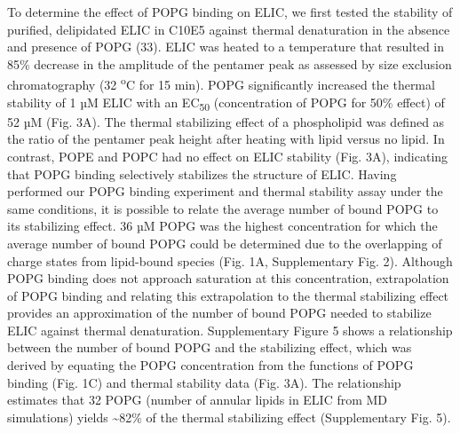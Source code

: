 To determine the effect of POPG binding on ELIC, we first tested the
stability of purified, delipidated ELIC in C10E5 against thermal
denaturation in the absence and presence of POPG (33). ELIC was heated
to a temperature that resulted in 85\% decrease in the amplitude of the
pentamer peak as assessed by size exclusion chromatography (32
\textsuperscript{o}C for 15 min). POPG significantly increased the
thermal stability of 1 µM ELIC with an EC\textsubscript{50}
(concentration of POPG for 50\% effect) of 52 µM (Fig. 3A). The thermal
stabilizing effect of a phospholipid was defined as the ratio of the
pentamer peak height after heating with lipid versus no lipid. In
contrast, POPE and POPC had no effect on ELIC stability (Fig. 3A),
indicating that POPG binding selectively stabilizes the structure of
ELIC. Having performed our POPG binding experiment and thermal stability
assay under the same conditions, it is possible to relate the average
number of bound POPG to its stabilizing effect. 36 µM POPG was the
highest concentration for which the average number of bound POPG could
be determined due to the overlapping of charge states from lipid-bound
species (Fig. 1A, Supplementary Fig. 2). Although POPG binding does not
approach saturation at this concentration, extrapolation of POPG binding
and relating this extrapolation to the thermal stabilizing effect
provides an approximation of the number of bound POPG needed to
stabilize ELIC against thermal denaturation. Supplementary Figure 5
shows a relationship between the number of bound POPG and the
stabilizing effect, which was derived by equating the POPG concentration
from the functions of POPG binding (Fig. 1C) and thermal stability data
(Fig. 3A). The relationship estimates that 32 POPG (number of annular
lipids in ELIC from MD simulations) yields \textasciitilde{}82\% of the
thermal stabilizing effect (Supplementary Fig. 5).

